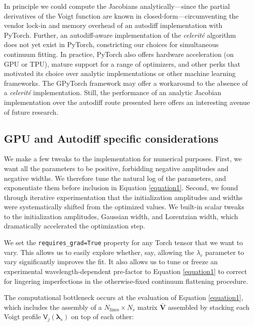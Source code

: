 \documentclass[modern]{aastex631}
\begin{document}
In principle we could compute the Jacobians analytically---since the partial derivatives of the Voigt function are known in closed-form---circumventing the vendor lock-in and memory overhead of an autodiff implementation with PyTorch.  Further, an autodiff-aware implementation of the \emph{celerit\'e} algorithm does not yet exist in PyTorch, constricting our choices for simultaneous continuum fitting.  In practice, PyTorch also offers hardware acceleration (on GPU or TPU), mature support for a range of optimizers, and other perks that motivated its choice over analytic implementations or other machine learning frameworks.  The GPyTorch framework may offer a workaround to the absence of a \emph{celerit\'e} implementation.  Still, the performance of an analytic Jacobian implementation over the autodiff route presented here offers an interesting avenue of future research.

\subsection{GPU and Autodiff specific considerations}
We make a few tweaks to the implementation for numerical purposes.  First, we want all the parameters to be positive, forbidding negative amplitudes and negative widths.  We therefore tune the natural log of the parameters, and exponentiate them before inclusion in Equation \ref{equation1}.  Second, we found through iterative experimentation that the initialization amplitudes and widths were systematically shifted from the optimized values.  We built-in scalar tweaks to the initialization amplitudes, Gaussian width, and Lorentzian width, which dramatically accelerated the optimization step.

We set the \texttt{requires\_grad=True} property for any Torch tensor that we want to vary.  This allows us to easily explore whether, say, allowing the $\lambda_c$ parameter to vary significantly improves the fit.  It also allows us to tune or freeze an experimental wavelength-dependent pre-factor to Equation \ref{equation1} to correct for lingering imperfections in the otherwise-fixed continuum flattening procedure.

The computational bottleneck occurs at the evaluation of Equation \ref{equation1}, which includes the assembly of a $N_{\mathrm{lines}}\times N_{s}$ matrix $\bm{\bar{V}}$ assembled by stacking each Voigt profile $\mathsf{V}_j(\bm{\lambda}_s)$ on top of each other:
\end{document}
